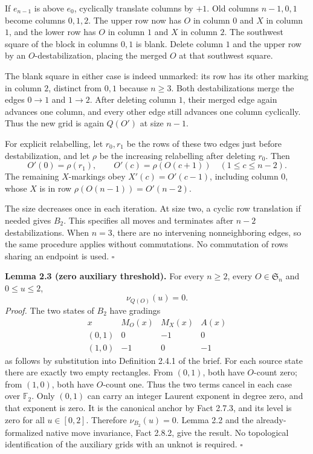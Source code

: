 \documentclass[11pt,a4paper]{article}
\begin{document}
If $e_{n-1}$ is above $e_0$, cyclically translate columns by $+1$. Old columns
$n-1,0,1$ become columns $0,1,2$. The upper row now has $O$ in column $0$
and $X$ in column $1$, and the lower row has $O$ in column $1$ and $X$ in
column $2$. The southwest square of the block in columns $0,1$ is blank.
Delete column $1$ and the upper row by an $O$-destabilization, placing the
merged $O$ at that southwest square.

The blank square in either case is indeed unmarked: its row has its other
marking in column $2$, distinct from $0,1$ because $n\ge3$. Both
destabilizations merge the edges $0\longrightarrow1$ and
$1\longrightarrow2$. After deleting column $1$, their merged edge again
advances one column, and every other edge still advances one column
cyclically. Thus the new grid is again $Q(O')$ at size $n-1$.

For explicit relabelling, let $r_0,r_1$ be the rows of these two edges just
before destabilization, and let $\rho$ be the increasing relabelling after
deleting $r_0$. Then
\[
O'(0)=\rho(r_1),\qquad O'(c)=\rho(O(c+1))\quad(1\le c\le n-2).
\]
The remaining $X$-markings obey $X'(c)=O'(c-1)$, including column $0$,
whose $X$ is in row $\rho(O(n-1))=O'(n-2)$.

The size decreases once in each iteration. At size two, a cyclic row
translation if needed gives $B_2$. This specifies all moves and terminates
after $n-2$ destabilizations. When $n=3$, there are no intervening
nonneighboring edges, so the same procedure applies without commutations.
No commutation of rows sharing an endpoint is used. $\square$

\textbf{Lemma 2.3 (zero auxiliary threshold).}
For every $n\ge2$, every $O\in\mathfrak S_n$ and $0\le u\le2$,
\[
\nu_{Q(O)}(u)=0.
\]
\textit{Proof.}
The two states of $B_2$ have gradings
\[
\begin{array}{c|ccc}
x&M_O(x)&M_X(x)&A(x)\\
(0,1)&0&-1&0\\
(1,0)&-1&0&-1
\end{array}
\]
as follows by substitution into Definition 2.4.1 of the brief.
For each source state there are exactly two empty rectangles. From $(0,1)$,
both have $O$-count zero; from $(1,0)$, both have $O$-count one. Thus the two
terms cancel in each case over $\mathbb F_2$.
Only $(0,1)$ can carry an integer Laurent exponent in degree zero, and that
exponent is zero. It is the canonical anchor by Fact 2.7.3, and its level
is zero for all $u\in[0,2]$. Therefore $\nu_{B_2}(u)=0$.
Lemma 2.2 and the already-formalized native move invariance, Fact 2.8.2,
give the result. No topological identification of the auxiliary grids
with an unknot is required. $\square$
\end{document}
